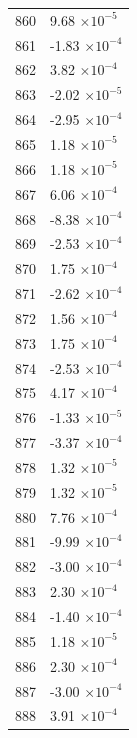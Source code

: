 \documentclass[a4paper,11pt]{article}
\begin{document}
\begin{center}
\begin{longtable}{|R{1.5cm}|R{2.5cm}|}
  860 &         9.68 $\times 10^{          -5}$ \\
  861 &        -1.83 $\times 10^{          -4}$ \\
  862 &         3.82 $\times 10^{          -4}$ \\
  863 &        -2.02 $\times 10^{          -5}$ \\
  864 &        -2.95 $\times 10^{          -4}$ \\
  865 &         1.18 $\times 10^{          -5}$ \\
  866 &         1.18 $\times 10^{          -5}$ \\
  867 &         6.06 $\times 10^{          -4}$ \\
  868 &        -8.38 $\times 10^{          -4}$ \\
  869 &        -2.53 $\times 10^{          -4}$ \\
  870 &         1.75 $\times 10^{          -4}$ \\
  871 &        -2.62 $\times 10^{          -4}$ \\
  872 &         1.56 $\times 10^{          -4}$ \\
  873 &         1.75 $\times 10^{          -4}$ \\
  874 &        -2.53 $\times 10^{          -4}$ \\
  875 &         4.17 $\times 10^{          -4}$ \\
  876 &        -1.33 $\times 10^{          -5}$ \\
  877 &        -3.37 $\times 10^{          -4}$ \\
  878 &         1.32 $\times 10^{          -5}$ \\
  879 &         1.32 $\times 10^{          -5}$ \\
  880 &         7.76 $\times 10^{          -4}$ \\
  881 &        -9.99 $\times 10^{          -4}$ \\
  882 &        -3.00 $\times 10^{          -4}$ \\
  883 &         2.30 $\times 10^{          -4}$ \\
  884 &        -1.40 $\times 10^{          -4}$ \\
  885 &         1.18 $\times 10^{          -5}$ \\
  886 &         2.30 $\times 10^{          -4}$ \\
  887 &        -3.00 $\times 10^{          -4}$ \\
  888 &         3.91 $\times 10^{          -4}$ \\

\end{longtable}
\end{center}
\end{document}

